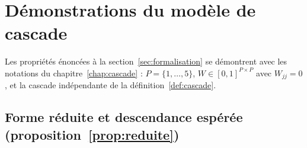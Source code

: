 ﻿%
%

\chapter{Démonstrations du modèle de cascade}
\label{ann:cascade}


Les propriétés énoncées à la section~\ref{sec:formalisation} se démontrent avec les
notations du chapitre~\ref{chap:cascade} : $P=\{1,\dots,5\}$, $W\in[0,1]^{P\times P}$
avec $W_{jj}=0$, et la cascade indépendante de la définition~\ref{def:cascade}.

\section*{Forme réduite et descendance espérée (proposition~\ref{prop:reduite})}

